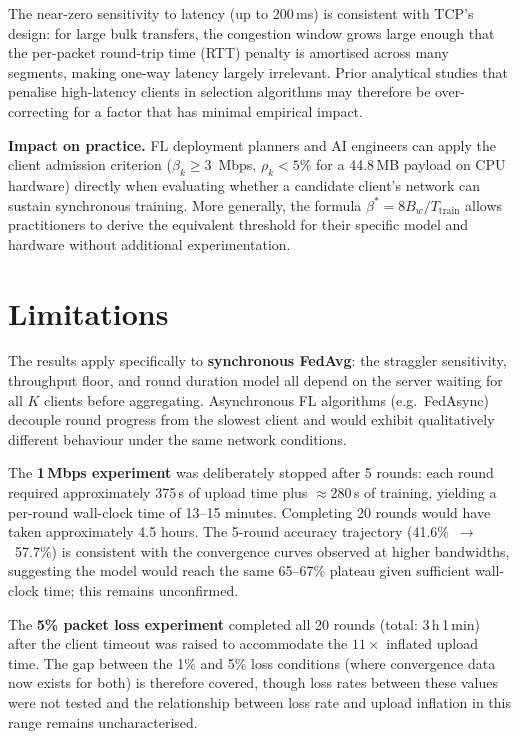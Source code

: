 \documentclass[12pt,a4paper]{report}
\begin{document}
The near-zero sensitivity to latency (up to 200\,ms) is consistent with
TCP's design: for large bulk transfers, the congestion window grows large
enough that the per-packet round-trip time (RTT) penalty is amortised
across many segments, making one-way latency largely irrelevant.  Prior
analytical studies that penalise high-latency clients in selection
algorithms may therefore be over-correcting for a factor that has minimal
empirical impact.

\textbf{Impact on practice.}
FL deployment planners and AI engineers can apply the client admission
criterion ($\beta_k \geq 3$~Mbps, $\rho_k < 5\%$ for a 44.8\,MB payload
on CPU hardware) directly when evaluating whether a candidate client's
network can sustain synchronous training.  More generally, the formula
$\beta^* = 8 B_w / T_{\mathrm{train}}$ allows practitioners to derive
the equivalent threshold for their specific model and hardware without
additional experimentation.

\section{Limitations}

The results apply specifically to \textbf{synchronous FedAvg}: the
straggler sensitivity, throughput floor, and round duration model all
depend on the server waiting for all $K$ clients before aggregating.
Asynchronous FL algorithms (e.g.\ FedAsync) decouple round progress from
the slowest client and would exhibit qualitatively different behaviour
under the same network conditions.

The \textbf{1\,Mbps experiment} was deliberately stopped after 5 rounds:
each round required approximately 375\,s of upload time plus
$\approx$280\,s of training, yielding a per-round wall-clock time of
13--15 minutes.  Completing 20 rounds would have taken approximately
4.5 hours.  The 5-round accuracy trajectory (41.6\%~$\to$~57.7\%) is
consistent with the convergence curves observed at higher bandwidths,
suggesting the model would reach the same 65--67\% plateau given
sufficient wall-clock time; this remains unconfirmed.

The \textbf{5\% packet loss experiment} completed all 20 rounds (total:
3\,h\,1\,min) after the client timeout was raised to accommodate the
$11\times$ inflated upload time.  The gap between the 1\% and 5\% loss
conditions (where convergence data now exists for both) is therefore
covered, though loss rates between these values were not tested and
the relationship between loss rate and upload inflation in this range
remains uncharacterised.
\end{document}
